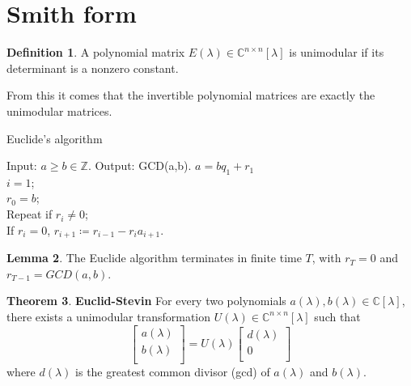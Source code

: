 \documentclass[12pt, openany]{report}
\theoremstyle{definition}
\newtheorem{thm}{Theorem}[chapter]
\newtheorem{definition}[thm]{Definition}
\newtheorem{lem}[thm]{Lemma}
\newcommand{\C}{\mathbb{C}}
\begin{document}
\section{Smith form}
\begin{definition}
    A polynomial matrix $E(\lambda)\in \C^{n\times n}[\lambda]$ is unimodular if its determinant is a nonzero constant.
\end{definition}
From this it comes that the invertible polynomial matrices are exactly the unimodular matrices. 
\begin{algorithm}[H]
    \caption{Euclide's algorithm}
    \begin{algorithmic}[1]
        \State Input: $a\ge b\in \mathbb{Z}$.
        \State Output: GCD(a,b).
        \State $a = bq_1+r_1$ \\
        $i=1$;\\
        $r_0 = b$;\\
        Repeat if $r_i\neq 0$;\\
        If $r_i = 0$, $r_{i+1} \coloneqq r_{i-1}-r_i a_{i+1}$.
    \end{algorithmic}
\end{algorithm}
\begin{lem}
    The Euclide algorithm terminates in finite time $T$, with $r_T=0$ and $r_{T-1} = GCD(a,b)$. 
\end{lem}
\begin{thm}\textbf{Euclid-Stevin}
    For every two polynomials $a(\lambda),b(\lambda)\in \C[\lambda]$, there exists a unimodular transformation $U(\lambda)\in \C^{n\times n}[\lambda]$ such that 
    \begin{equation}
        \begin{bmatrix}
            a(\lambda)\\ b(\lambda)\\
        \end{bmatrix} = U(\lambda)\begin{bmatrix}
            d(\lambda)\\ 0\\
        \end{bmatrix}
    \end{equation}
    where $d(\lambda)$ is the greatest common divisor (gcd) of $a(\lambda)$ and $b(\lambda)$.
\end{thm}
\end{document}
